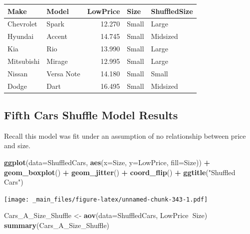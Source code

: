 \documentclass[]{book}
\newenvironment{Shaded}{\begin{snugshade}}{\end{snugshade}}
\newcommand{\KeywordTok}[1]{\textcolor[rgb]{0.13,0.29,0.53}{\textbf{#1}}}
\newcommand{\DataTypeTok}[1]{\textcolor[rgb]{0.13,0.29,0.53}{#1}}
\newcommand{\StringTok}[1]{\textcolor[rgb]{0.31,0.60,0.02}{#1}}
\newcommand{\OperatorTok}[1]{\textcolor[rgb]{0.81,0.36,0.00}{\textbf{#1}}}
\newcommand{\NormalTok}[1]{#1}
\begin{document}
\begin{tabular}{l|l|r|l|l}
\hline
Make & Model & LowPrice & Size & ShuffledSize\\
\hline
Chevrolet & Spark & 12.270 & Small & Large\\
\hline
Hyundai & Accent & 14.745 & Small & Midsized\\
\hline
Kia & Rio & 13.990 & Small & Large\\
\hline
Mitsubishi & Mirage & 12.995 & Small & Large\\
\hline
Nissan & Versa Note & 14.180 & Small & Small\\
\hline
Dodge & Dart & 16.495 & Small & Midsized\\
\hline
\end{tabular}

\subsection{Fifth Cars Shuffle Model
Results}\label{fifth-cars-shuffle-model-results-1}

Recall this model was fit under an assumption of no relationship between
price and size.

\begin{Shaded}
\begin{Highlighting}[]
\KeywordTok{ggplot}\NormalTok{(}\DataTypeTok{data=}\NormalTok{ShuffledCars, }\KeywordTok{aes}\NormalTok{(}\DataTypeTok{x=}\NormalTok{Size, }\DataTypeTok{y=}\NormalTok{LowPrice, }\DataTypeTok{fill=}\NormalTok{Size)) }\OperatorTok{+}\StringTok{ }
\StringTok{  }\KeywordTok{geom_boxplot}\NormalTok{() }\OperatorTok{+}\StringTok{ }\KeywordTok{geom_jitter}\NormalTok{() }\OperatorTok{+}\StringTok{ }\KeywordTok{coord_flip}\NormalTok{() }\OperatorTok{+}\StringTok{ }\KeywordTok{ggtitle}\NormalTok{(}\StringTok{"Shuffled Cars"}\NormalTok{)}
\end{Highlighting}
\end{Shaded}

\texttt{[image: \_main\_files/figure-latex/unnamed-chunk-343-1.pdf]}

\begin{Shaded}
\begin{Highlighting}[]
\NormalTok{Cars_A_Size_Shuffle <-}\StringTok{ }\KeywordTok{aov}\NormalTok{(}\DataTypeTok{data=}\NormalTok{ShuffledCars, LowPrice}\OperatorTok{~}\NormalTok{Size)}
\KeywordTok{summary}\NormalTok{(Cars_A_Size_Shuffle)}
\end{Highlighting}
\end{Shaded}
\end{document}
